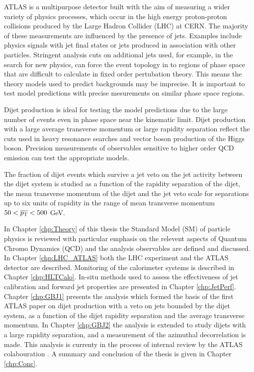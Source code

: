 ATLAS is a multipurpose detector built with the aim of measuring a wider variety of physics processes, which occur in the high energy proton-proton collisions produced by the Large Hadron Collider (LHC) at CERN.
The majority of these measurements are influenced by the presence of jets.
Examples include physics signals with jet final states or jets produced in association with other particles.
Stringent analysis cuts on additional jets used, for example, in the search for new physics, can force the event topology in to regions of phase space that are difficult to calculate in fixed order pertubation theory.
This means the theory models used to predict backgrounds may be imprecise.
It is important to test model predictions with precise mesurements on similar phase space regions.

Dijet production is ideal for testing the model predictions due to the large number of events even in phase space near the kinematic limit. 
Dijet production with a large average transverse momentum or large rapidity separation reflect the cuts used in heavy resonance searches and vector boson production of the Higgs boson. 
Precision measurements of observables sensitive to higher order QCD emission can test the appropriate models.

The fraction of dijet events which survive a jet veto on the jet activity between the dijet system is studied as a function of the rapidity separation of the dijet, the mean transverse momentum of the dijet and the jet veto scale for separations up to six units of rapidity in the range of mean transverse momentum $50<\mbox{$\overline{p_{\rm T}}$}{}<500$ GeV.

In Chapter \ref{chp:Theory} of this thesis the Standard Model (SM) of particle physics is reviewed with particular emphasis on the relevent aspects of Quantum Chromo Dynamics (QCD) and the analysis observables are defined and discussed. 
In Chapter \ref{chp:LHC_ATLAS} both the LHC experiment and the ATLAS detector are described. 
Monitoring of the calorimeter systems is described in Chapter \ref{chp:HLTCalo}.
In-situ methods used to assess the effectiveness of jet calibration and forward jet properties are presented in Chapter \ref{chp:JetPerf}.
Chapter \ref{chp:GBJ1} presents the analysis which formed the basis of the first ATLAS paper \cite{ref:ATLASGap} on dijet production with a veto on jets bounded by the dijet system, as a function of the dijet rapidity separation and the average transverse momentum. 
In Chapter \ref{chp:GBJ2} the analysis is extended to study dijets with a large rapidity separation, and a measurement of the azimuthal decorrelation is made.
This analysis is currenty in the process of internal review by the ATLAS colabouration \cite{ref:GBJInternal}.
A summary and conclusion of the thesis is given in Chapter \ref{chp:Conc}.


